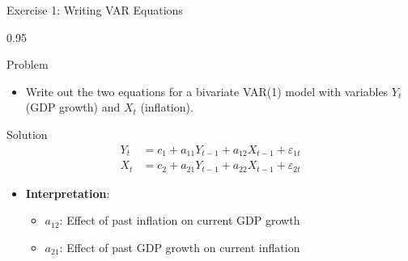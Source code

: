 \documentclass[9pt, aspectratio=169, t]{beamer}
\begin{document}
\begin{frame}{Exercise 1: Writing VAR Equations}
    \begin{cminipage}{0.95\textwidth}
    \begin{alertblock}{Problem}
        \begin{itemize}\setlength{\itemsep}{0pt}
            \item Write out the two equations for a bivariate VAR(1) model with variables $Y_t$ (GDP growth) and $X_t$ (inflation).
        \end{itemize}
    \end{alertblock}

    \vspace{0.2cm}
    \begin{exampleblock}{Solution}
        \begin{align*}
            Y_t &= c_1 + a_{11} Y_{t-1} + a_{12} X_{t-1} + \varepsilon_{1t} \\[0.2cm]
            X_t &= c_2 + a_{21} Y_{t-1} + a_{22} X_{t-1} + \varepsilon_{2t}
        \end{align*}

        \begin{itemize}\setlength{\itemsep}{0pt}
            \item \textbf{Interpretation}:
            \begin{itemize}\setlength{\itemsep}{0pt}
                \item $a_{12}$: Effect of past inflation on current GDP growth
                \item $a_{21}$: Effect of past GDP growth on current inflation
            \end{itemize}
        \end{itemize}
    \end{exampleblock}
    \end{cminipage}
\end{frame}
\end{document}
